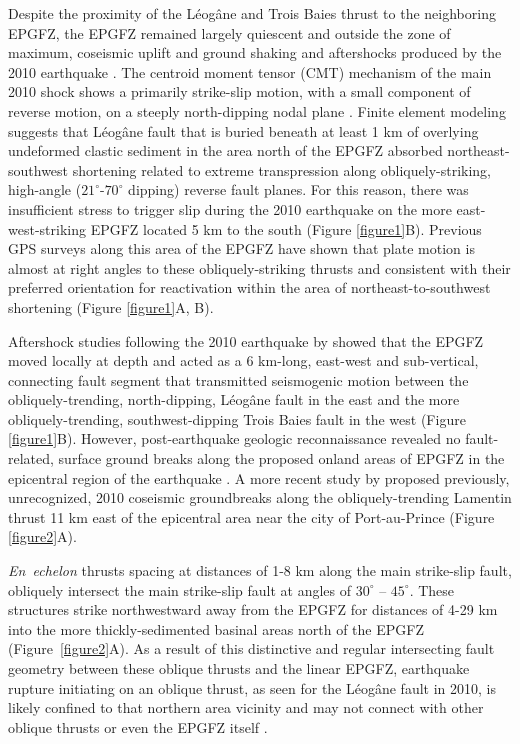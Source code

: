 \documentclass[linenumbers,draft]{agujournal}
\begin{document}
Despite the proximity of the L\'eog\^ane and Trois Baies thrust to the neighboring EPGFZ, the EPGFZ remained largely quiescent and outside the zone of maximum, coseismic uplift and ground shaking and aftershocks produced by the 2010 earthquake \citep{nettles2010earthquake}. The centroid moment tensor (CMT) mechanism of the main 2010 shock shows a primarily strike-slip motion, with a small component of reverse motion, on a steeply north-dipping nodal plane \citep{nettles2010earthquake,douilly2013crustal}. Finite element modeling \citep{douilly2015three} suggests that L\'eog\^ane fault that is buried beneath at least 1 km of overlying undeformed clastic sediment in the area north of the EPGFZ absorbed northeast-southwest shortening related to extreme transpression along obliquely-striking, high-angle ($21^{\circ}$-$70^{\circ}$ dipping) reverse fault planes. For this reason, there was insufficient stress to trigger slip during the 2010 earthquake on the more east-west-striking EPGFZ located 5 km to the south (Figure \ref{figure1}B). Previous GPS surveys \citep{calais2010transpressional,calais2016plate} along this area of the EPGFZ have shown that plate motion is almost at right angles to these obliquely-striking thrusts and consistent with their preferred orientation for reactivation within the area of northeast-to-southwest shortening (Figure \ref{figure1}A, B).

Aftershock studies following the 2010 earthquake by \citet{douilly2013crustal,douilly2015three} showed that the EPGFZ moved locally at depth and acted as a 6 km-long, east-west and sub-vertical, connecting fault segment that transmitted seismogenic motion between the obliquely-trending, north-dipping, L\'eog\^ane fault in the east and the more obliquely-trending, southwest-dipping Trois Baies fault in the west (Figure \ref{figure1}B). However, post-earthquake geologic reconnaissance revealed no fault-related, surface ground breaks along the proposed onland areas of EPGFZ in the epicentral region of the earthquake \citep{prentice2010seismic,koehler2011field,rathje2014geotechnical}. A more recent study by \citet{saint2015seismotectonics} proposed previously, unrecognized, 2010 coseismic groundbreaks along the obliquely-trending Lamentin thrust 11 km east of the epicentral area near the city of Port-au-Prince (Figure \ref{figure2}A).

\textit{En~echelon} thrusts spacing at distances of 1-8 km along the main strike-slip fault, obliquely intersect the main strike-slip fault at angles of $30^{\circ}$ -- $45^{\circ}$. These structures strike northwestward away from the EPGFZ for distances of 4-29 km into the more thickly-sedimented basinal areas north of the EPGFZ (Figure~\ref{figure2}A).  As a result of this distinctive and regular intersecting fault geometry between these oblique thrusts and the linear EPGFZ, earthquake rupture initiating on an oblique thrust, as seen for the L\'eog\^ane fault in 2010, is likely confined to that northern area vicinity and may not connect with other oblique thrusts or even the EPGFZ itself \citep{douilly2013crustal,douilly2015three}.
\end{document}
